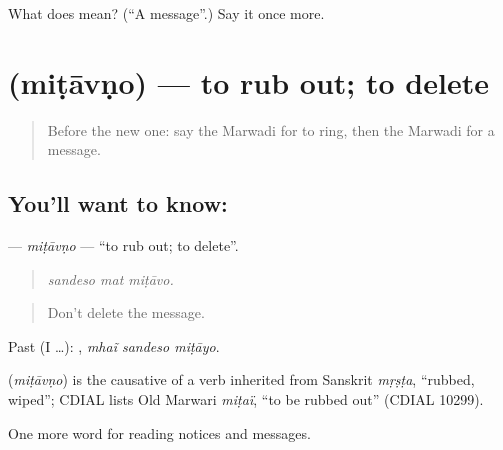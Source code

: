\begin{tcolorbox}[breakable,colback=teal!4,colframe=teal!35!black,title={Before you move on}]
What does  mean? (\textquotedblleft{}A message\textquotedblright{}.) Say it once more.
\end{tcolorbox}
\section[\texorpdfstring{\mw{मिटावणो} (miṭāvṇo)}{मिटावणो (miṭāvṇo)}]{ (miṭāvṇo) — to rub out; to delete}

\label{lesson:MW-C197-mitavno}



\begin{quote}
Before the new one: say the Marwadi for to ring, then the Marwadi for a message.
\end{quote}

\subsection*{You'll want to know: }
\textbf{} — \emph{miṭāvṇo} — \textquotedblleft{}to rub out; to delete\textquotedblright{}.

\begin{quote}
  
\end{quote}

\begin{quote}
\emph{sandeso mat miṭāvo.}
\end{quote}

\begin{quote}
Don't delete the message.
\end{quote}

Past (I …):   , \emph{mhaĩ sandeso miṭāyo}.

\begin{cousinweb}
\textbf{} (\emph{miṭāvṇo}) is the causative of a verb inherited from Sanskrit \emph{mṛṣṭa}, \textquotedblleft{}rubbed, wiped\textquotedblright{}; CDIAL lists Old Marwari \emph{miṭaï}, \textquotedblleft{}to be rubbed out\textquotedblright{} (CDIAL 10299).
\end{cousinweb}

\begin{grammarlens}[title={What you've built}]
One more word for reading notices and messages.
\end{grammarlens}

